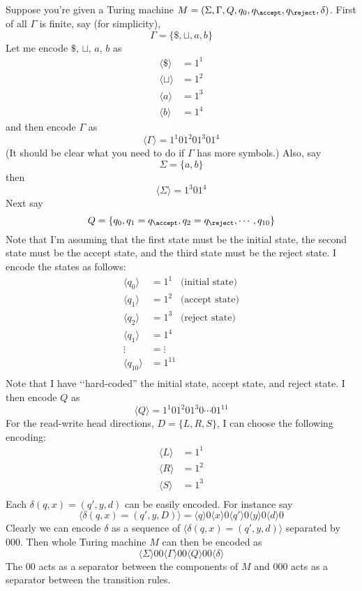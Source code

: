 Suppose you're given a Turing machine $M = (\Sigma, \Gamma, Q, q_0, q_\accept, q_\reject,
\delta)$.
First of all $\Gamma$ is finite, say (for simplicity),
\[
\Gamma = \{ \$, \sqcup, a, b\}
\]
Let me encode $ \$ $, $\sqcup$, $a$, $b$ as
\begin{align*}
  \langle \$ \rangle  &= 1^1 \\
  \langle \sqcup \rangle  &= 1^2 \\
  \langle a \rangle  &= 1^3 \\
  \langle b \rangle  &= 1^4 
\end{align*}
and then encode $\Gamma$ as
\[
\langle \Gamma \rangle
= 1^1 0 1^2 0 1^3 0 1^4
\]
(It should be clear what you need to do if $\Gamma$ has more symbols.)
Also, say
\[
\Sigma = \{ a, b \}
\]
then
\[
\langle \Sigma \rangle = 1^3 0 1^4
\]
Next say
\[
Q = \{q_0, q_1 = q_\accept, q_2 = q_\reject, \cdots, q_{10}\}
\]
Note that I'm assuming that the first state must be the initial state,
the second state must be the accept state, and the third state
must be the reject state.
I encode the states as follows:
\begin{align*}
  \langle q_0 \rangle  &= 1^1 \,\,\,\,\, \text{(initial state)} \\
  \langle q_1 \rangle  &= 1^2 \,\,\,\,\, \text{(accept state)} \\
  \langle q_2 \rangle  &= 1^3 \,\,\,\,\, \text{(reject state)} \\
  \langle q_1 \rangle  &= 1^4 \\
  \vdots &= \vdots \\
  \langle q_{10} \rangle  &= 1^{11} \\
\end{align*}
Note that I have \lq\lq hard-coded'' the initial state, accept state,
and reject state.
I then encode $Q$ as
\[
\langle Q \rangle =
1^1 0 1^2 0 1^3 0 \cdots 0 1^{11}
\]
For the read-write head directions, $D = \{ L, R, S \}$,
I can choose the following encoding:
\begin{align*}
  \langle L \rangle &= 1^1 \\
  \langle R \rangle &= 1^2 \\
  \langle S \rangle &= 1^3 \\
\end{align*}
Each $\delta(q, x) = (q', y, d)$ can be easily encoded.
For instance say
\[
\biggl\langle \delta(q, x) = (q', y, D) \biggr\rangle = 
\langle q \rangle 0
\langle x \rangle 0
\langle q' \rangle 0
\langle y \rangle 0
\langle d \rangle 0
\]
Clearly we can encode $\delta$ as a 
sequence of $\langle \delta(q, x) = (q', y, d) \rangle$
separated by $000$.
Then whole Turing machine $M$ can then be encoded as
\[
\langle \Sigma \rangle 00
\langle \Gamma \rangle 00
\langle Q \rangle 00
\langle \delta \rangle
\]
The $00$ acts as a separator between the components of $M$
and $000$ acts as a separator between the transition rules.

